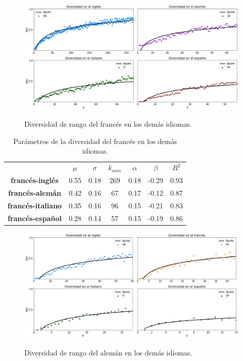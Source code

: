 \newpage

\begin{figure}[h!]
	\centering
	\includegraphics[width=1 \textwidth, scale = .38]{Cap_6/DR_FR.png}
	\label{fig.DR_FR}
	\caption{Diversidad de rango del francés en los demás idiomas.}
\end{figure}


\begin{table}[h!]
	\centering
	\begin{tabular}{ccccccc}
		\textbf{}                & \textbf{$\mu$} & \textbf{$\sigma$} & \textbf{$k_{min}$} & \textbf{$\alpha$} & \textbf{$\beta$} & \textbf{$R^{2}$} \\
		\textbf{francés-inglés}  & 0.55           & 0.18                & 269                   & 0.18           & -0.29        & 0.93        \\
		\textbf{francés-alemán}   & 0.42           & 0.16                & 67                    & 0.17           & -0.12         & 0.87        \\
		\textbf{francés-italiano} & 0.35           & 0.16                & 96                    & 0.15           & -0.21         & 0.83        \\
		\textbf{francés-español}  & 0.28           & 0.14                & 57                    & 0.15           & -0.19         & 0.86       
	\end{tabular}
	\caption{Parámetros de la diversidad del francés en los demás idiomas.}
	\label{tab.DR_FR}
\end{table}


\newpage

\begin{figure}[h!]
	\centering
	\includegraphics[width=1 \textwidth, scale = .38]{Cap_6/DR_GE.png}
	\label{fig.DR_GE}
	\caption{Diversidad de rango del alemán en los demás idiomas.}
\end{figure}


